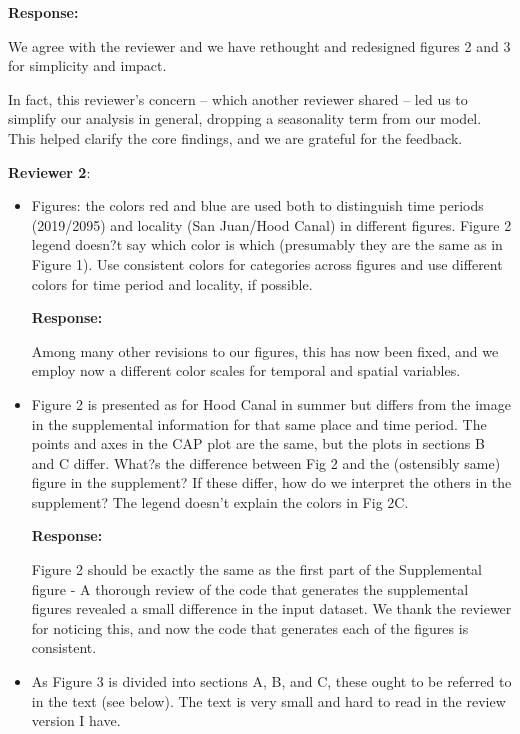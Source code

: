 \documentclass[11pt]{article}
\begin{document}
\begin{linenumbers}
\begin{itemize}
\textbf{Response:}

We agree with the reviewer and we have rethought and redesigned figures 2 and 3 for simplicity and impact. 

In fact, this reviewer's concern -- which another reviewer shared -- led us to simplify our analysis in general, dropping a seasonality term from our model. This helped clarify the core findings, and we are grateful for the feedback. 

\end{itemize}

\vspace*{1em}
\textbf{\large{ Reviewer 2}}: 

\begin{itemize}
\item{Figures: the colors red and blue are used both to distinguish time periods (2019/2095) and locality (San Juan/Hood Canal) in different figures. Figure 2 legend doesn?t say which color is which (presumably they are the same as in Figure 1). Use consistent colors for categories across figures and use different colors for time period and locality, if possible.}

\textbf{Response:}

    Among many other revisions to our figures, this has now been fixed, and we employ now a different color scales for temporal and spatial variables.  
    
\item{Figure 2 is presented as for Hood Canal in summer but differs from the image in the supplemental information for that same place and time period. The points and axes in the CAP plot are the same, but the plots in sections B and C differ. What?s the difference between Fig 2 and the (ostensibly same) figure in the supplement? If these differ, how do we interpret the others in the supplement? The legend doesn't explain the colors in Fig 2C.} 

\textbf{Response:}

Figure 2 should be exactly the same as the first part of the Supplemental figure - A thorough review of the code that generates the supplemental figures revealed a small difference in the input dataset. We thank the reviewer for noticing this, and now the code that generates each of the figures is consistent.

\item{As Figure 3 is divided into sections A, B, and C, these ought to be referred to in the text (see below). The text is very small and hard to read in the review version I have.}


\end{itemize}
\end{linenumbers}
\end{document}
